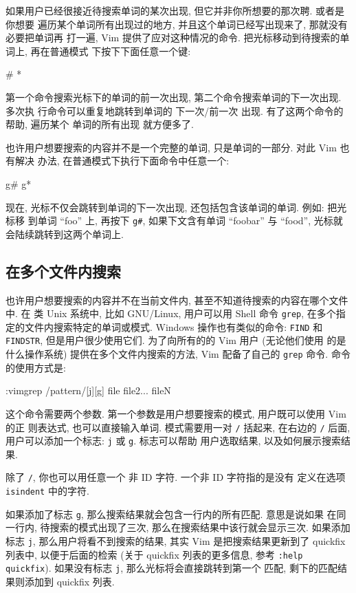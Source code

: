 如果用户已经很接近待搜索单词的某次出现, 但它并非你所想要的那次聘. 或者是你想要
遍历某个单词所有出现过的地方, 并且这个单词已经写出现来了, 那就没有必要把单词再
打一遍, Vim 提供了应对这种情况的命令. 把光标移动到待搜索的单词上, 再在普通模式 
下按下下面任意一个键:
\begin{vimcmd}
#
*
\end{vimcmd}
第一个命令搜索光标下的单词的前一次出现, 第二个命令搜索单词的下一次出现. 多次执 
行命令可以重复地跳转到单词的 下一次/前一次 出现. 有了这两个命令的帮助, 遍历某个 
单词的所有出现 就方便多了.

也许用户想要搜索的内容并不是一个完整的单词, 只是单词的一部分. 对此 Vim 也有解决 
办法, 在普通模式下执行下面命令中任意一个:
\begin{vimcmd}
g#
g*
\end{vimcmd}
现在, 光标不仅会跳转到单词的下一次出现, 还包括包含该单词的单词. 例如: 把光标移 
到单词 ``foo'' 上, 再按下 \texttt{g\#}, 如果下文含有单词 ``foobar'' 与 ``food'',
光标就会陆续跳转到这两个单词上.

\subsection{在多个文件内搜索}
\label{subsec:search_in_multiple_files}

也许用户想要搜索的内容并不在当前文件内, 甚至不知道待搜索的内容在哪个文件中. 在
类 Unix 系统中, 比如 GNU/Linux, 用户可以用 Shell 命令 \texttt{grep}, 在多个指
定的文件内搜索特定的单词或模式. Windows 操作也有类似的命令: \texttt{FIND} 和
\texttt{FINDSTR}, 但是用户很少使用它们. 为了向所有的的 Vim 用户 (无论他们使用
的是什么操作系统) 提供在多个文件内搜索的方法, Vim 配备了自己的 \texttt{grep} 
命令. 命令的使用方式是:
\begin{vimcmd}
:vimgrep /pattern/[j][g] file file2... fileN
\end{vimcmd}
这个命令需要两个参数. 第一个参数是用户想要搜索的模式, 用户既可以使用 Vim 的正
则表达式, 也可以直接输入单词. 模式需要用一对 \texttt{/} 括起来, 在右边的
\texttt{/} 后面, 用户可以添加一个标志: \texttt{j} 或 \texttt{g}. 标志可以帮助
用户选取结果, 以及如何展示搜索结果.
\begin{warning}
    除了 \texttt{/}, 你也可以用任意一个 非 ID 字符. 一个非 ID 字符指的是没有
    定义在选项 \texttt{isindent} 中的字符.
\end{warning}

如果添加了标志 \texttt{g}, 那么搜索结果就会包含一行内的所有匹配. 意思是说如果
在同一行内, 待搜索的模式出现了三次, 那么在搜索结果中该行就会显示三次. 如果添加 
标志 \texttt{j}, 那么用户将看不到搜索的结果, 其实 Vim 是把搜索结果更新到了
quickfix 列表中, 以便于后面的检索 (关于 quickfix 列表的更多信息, 参考
\texttt{:help quickfix}). 如果没有标志 \texttt{j}, 那么光标将会直接跳转到第一个
匹配, 剩下的匹配结果则添加到 quickfix 列表.

